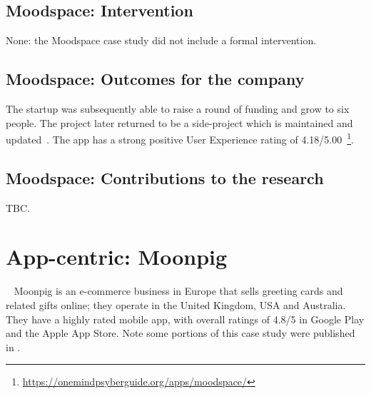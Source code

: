 \subsection{Moodspace: Intervention}
None: the Moodspace case study did not include a formal intervention.

\subsection{Moodspace: Outcomes for the company}
The startup was subsequently able to raise a round of funding and grow to six people. The project later returned to be a side-project which is maintained and updated~. %
The app has a strong positive User Experience rating of 4.18/5.00~\footnote{\url{https://onemindpsyberguide.org/apps/moodspace/}}.



\subsection{Moodspace: Contributions to the research}
TBC.

\clearpage


\section{App-centric: Moonpig}~\label{case-study-overview-moonpig}
Moonpig is an e-commerce business in Europe that sells greeting cards and related gifts online; they operate in the United Kingdom, USA and Australia. They have a highly rated mobile app, with overall ratings of 4.8/5 in Google Play and the Apple App Store. Note some portions of this case study were published in .

